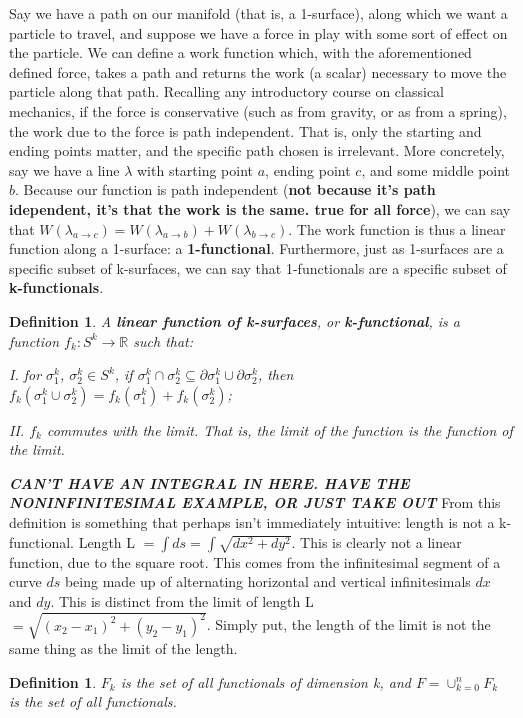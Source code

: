 \documentclass{book}
\newtheorem{defn}[equation]{Definition}
\begin{document}
Say we have a path on our manifold (that is, a 1-surface), along which we want a particle to travel, and suppose we have a force in play with some sort of effect on the particle. We can define a work function which, with the aforementioned defined force, takes a path and returns the work (a scalar) necessary to move the particle along that path. Recalling any introductory course on classical mechanics, if the force is conservative (such as from gravity, or as from a spring), the work due to the force is path independent. That is, only the starting and ending points matter, and the specific path chosen is irrelevant. More concretely, say we have a line $\lambda$ with starting point $a$, ending point $c$, and some middle point $b$. Because our function is path independent (\textbf{not because it's path idependent, it's that the work is the same. true for all force}), we can say that $W(\lambda_{a \to c}) = W(\lambda_{a \to b}) + W(\lambda_{b \to c})$. The work function is thus a linear function along a 1-surface: a \textbf{1-functional}. Furthermore, just as 1-surfaces are a specific subset of k-surfaces, we can say that 1-functionals are a specific subset of \textbf{k-functionals}. 


\begin{defn}
	A \textbf{linear function of k-surfaces}, or \textbf{k-functional}, is a function $f_k : S^k \to \mathbb{R}$ such that:
	
	I. for $\sigma^k_1$, $\sigma^k_2 \in S^k$, if $\sigma^k_1 \cap \sigma^k_2 \subseteq \partial \sigma^k_1 \cup \partial \sigma^k_2$, then $f_k(\sigma^k_1\cup \sigma^k_2) = f_k(\sigma^k_1) + f_k(\sigma^k_2)$; 
	
	II. $f_k$ commutes with the limit. That is, the limit of the function is the function of the limit. 
\end{defn}

\textbf{\emph{CAN'T HAVE AN INTEGRAL IN HERE. HAVE THE NONINFINITESIMAL EXAMPLE, OR JUST TAKE OUT}}
From this definition is something that perhaps isn't immediately intuitive: length is not a k-functional. Length L $= \int ds = \int \sqrt{dx^2 + dy^2}$. This is clearly not a linear function, due to the square root. This comes from the infinitesimal segment of a curve $ds$ being made up of alternating horizontal and vertical infinitesimals $dx$ and $dy$. This is distinct from the limit of length L $= \sqrt{(x_2 - x_1)^2 + (y_2 - y_1)^2}$. Simply put, the length of the limit is not the same thing as the limit of the length. 


\begin{defn}
	$F_k$ is the set of all functionals of dimension k, and $F = \cup_{k=0}^nF_k$ is the set of all functionals. 
\end{defn}
\end{document}
